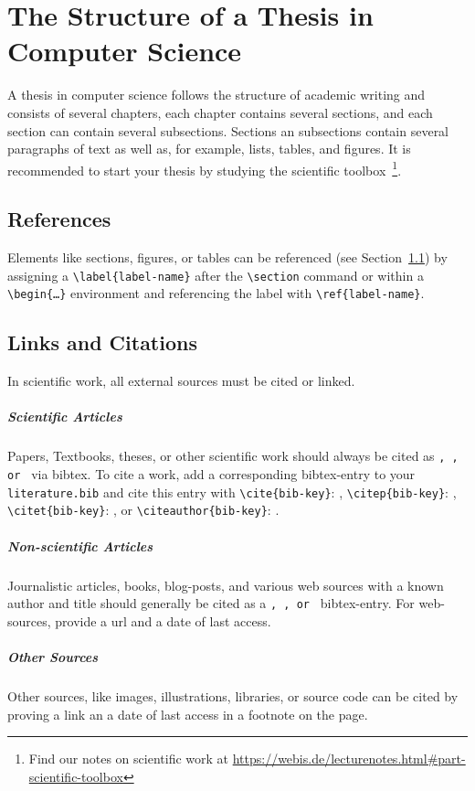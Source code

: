 \chapter{The Structure of a Thesis in Computer Science}\label{structure}

A thesis in computer science follows the structure of academic writing and consists of several chapters, each chapter contains several sections, and each section can contain several subsections. Sections an subsections contain several paragraphs of text as well as, for example, lists, tables, and figures. It is recommended to start your thesis by studying the scientific toolbox~\footnote{Find our notes on scientific work at \url{https://webis.de/lecturenotes.html\#part-scientific-toolbox}}.

\enlargethispage{\baselineskip}

\section{References}\label{references}

Elements like sections, figures, or tables can be referenced (see Section~\ref{references}) by assigning a \texttt{\textbackslash label\{label-name\}} after the  \texttt{\textbackslash section} command or within a \texttt{\textbackslash begin\{\dots\}} environment and referencing the label with \texttt{\textbackslash ref\{label-name\}}. 

\section{Links and Citations}

In scientific work, all external sources must be cited or linked. 

\paragraph{Scientific Articles} Papers, Textbooks, theses, or other scientific work should always be cited as \texttt{\@Article, \@InProceedings, or \@Book} via bibtex. To cite a work, add a corresponding bibtex-entry to your \texttt{literature.bib} and cite this entry with \texttt{\textbackslash cite\{bib-key\}}: \cite{manning:2001}, \texttt{\textbackslash citep\{bib-key\}}: \citep{manning:2001}, \texttt{\textbackslash citet\{bib-key\}}: \citet{manning:2001}, or \texttt{\textbackslash citeauthor\{bib-key\}}: \citeauthor{manning:2001}. 

\paragraph{Non-scientific Articles} Journalistic articles, books, blog-posts, and various web sources with a known author and title should generally be cited as a \texttt{\@Article, \@Book, or \@Misc} bibtex-entry. For web-sources, provide a url and a date of last access.

\paragraph{Other Sources} Other sources, like images, illustrations, libraries, or source code can be cited by proving a link an a date of last access in a footnote on the page.  